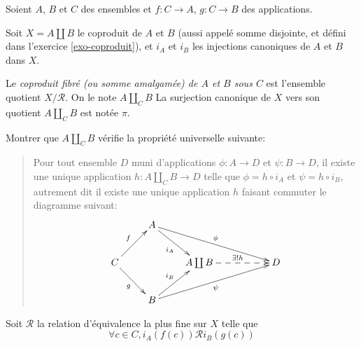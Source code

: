 \begin{exercice}
Soient $A$,  $B$ et $C$  des ensembles et $f :  C\to A$, $g : C\to B$ des applications.

Soit $X = A\coprod B$ le coproduit de $A$ et $B$ (aussi appelé somme disjointe, et défini dans l'exercice \ref{exo-coproduit}), et $i_A$ et $i_B$ les injections canoniques de $A$ et $B$ dans $X$.



Le \emph{coproduit fibré (ou somme amalgamée) de $A$ et $B$  sous $C$} est l'ensemble quotient $X/\mathcal R$. On le note $A\coprod_C B$ La surjection canonique de $X$ vers son quotient $A\coprod_C B$ est notée $\pi$.

Montrer que $A\coprod_C B$ vérifie la propriété universelle suivante:
\begin{quote}
Pour tout ensemble  $D$ muni d'applications $\phi : A\to D$ et $\psi : B\to D$, il existe une unique application $h : A\coprod_C B \to D$ telle que $\phi = h\circ i_A$ et $\psi = h\circ i_B$, autrement dit il existe une unique application $h$ faisant commuter le diagramme  suivant:
\[ 
\xymatrix{
&A \ar[dr]_{i_A} \ar[drrr]^{\phi}& & & \\
C\ar[ur]^f\ar[dr]_g& &  A\coprod B \ar@{-->}[rr]^{\exists !h}  & & D\\
& B \ar[ur]^{i_B} \ar[urrr]_{\psi}& & &
}\]
\end{quote}

Soit $\mathcal R$ la relation d'équivalence la plus fine sur $X$ telle que 
\[
\forall c\in C, i_A(f(c))\mathcal R i_B(g(c))
\]

\end{exercice}


